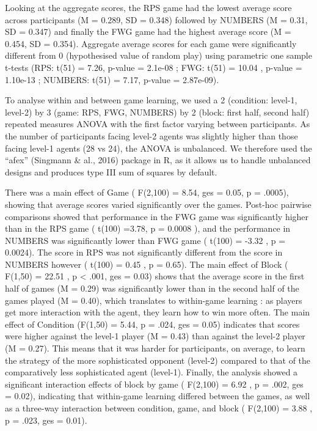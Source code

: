 \documentclass[,man,floatsintext]{apa6}
\begin{document}
Looking at the aggregate scores, the RPS game had the lowest average score across participants (M = 0.289, SD = 0.348) followed by NUMBERS (M = 0.31, SD = 0.347) and finally the FWG game had the highest average score (M = 0.454, SD = 0.354). Aggregate average scores for each game were significantly different from 0 (hypothesised value of random play) using parametric one sample t-tests (RPS: t(51) = 7.26, p-value = 2.1e-08 ; FWG: t(51) = 10.04 , p-value = 1.10e-13 ; NUMBERS: t(51) = 7.17, p-value = 2.87e-09).

To analyse within and between game learning, we used a 2 (condition: level-1, level-2) by 3 (game: RPS, FWG, NUMBERS) by 2 (block: first half, second half) repeated measures ANOVA with the first factor varying between participants. As the number of participants facing level-2 agents was slightly higher than those facing level-1 agents (28 vs 24), the ANOVA is unbalanced. We therefore used the \enquote{afex} (Singmann \& al., 2016) package in R, as it allows us to handle unbalanced designs and produces type III sum of squares by default.

There was a main effect of Game ( F(2,100) = 8.54, ges = 0.05, p = .0005), showing that average scores varied significantly over the games. Post-hoc pairwise comparisons showed that performance in the FWG game was significantly higher than in the RPS game ( t(100) =3.78, p = 0.0008 ), and the performance in NUMBERS was significantly lower than FWG game ( t(100) = -3.32 , p = 0.0024). The score in RPS was not significantly different from the score in NUMBERS however ( t(100) = 0.45 , p = 0.65). The main effect of Block ( F(1,50) = 22.51 , p \textless{} .001, ges = 0.03) shows that the average score in the first half of games (M = 0.29) was significantly lower than in the second half of the games played (M = 0.40), which translates to within-game learning : as players get more interaction with the agent, they learn how to win more often. The main effect of Condition (F(1,50) = 5.44, p = .024, ges = 0.05) indicates that scores were higher against the level-1 player (M = 0.43) than against the level-2 player (M = 0.27). This means that it was harder for participants, on average, to learn the strategy of the more sophisticated opponent (level-2) compared to that of the comparatively less sophisticated agent (level-1). Finally, the analysis showed a significant interaction effects of block by game ( F(2,100) = 6.92 , p = .002, ges = 0.02), indicating that within-game learning differed between the games, as well as a three-way interaction between condition, game, and block ( F(2,100) = 3.88 , p = .023, ges = 0.01).
\end{document}
